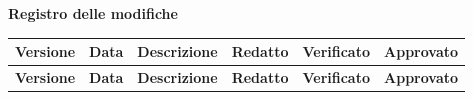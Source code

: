 \documentclass[a4paper,11pt]{article}
\begin{document}
\newpage

{\Large\bfseries\color{primaryblue} Registro delle modifiche}\\[0.5cm]

\setlength{\extrarowheight}{2pt}
\renewcommand{\arraystretch}{1.5}

{\footnotesize
\begin{xltabular}{\textwidth}{|>{\raggedright\arraybackslash}p{1.5cm}|>{\raggedright\arraybackslash}p{2cm}|X|>{\raggedright\arraybackslash}p{1.8cm}|>{\raggedright\arraybackslash}p{2cm}|>{\raggedright\arraybackslash}p{2cm}|}
\hline
{}
\textbf{\color{white} Versione} & \textbf{\color{white} Data} & \textbf{\color{white} Descrizione} & \textbf{\color{white} Redatto} & \textbf{\color{white} Verificato} & \textbf{\color{white} Approvato} \\
\hline
\endfirsthead %

\hline
{}
\textbf{\color{white} Versione} & \textbf{\color{white} Data} & \textbf{\color{white} Descrizione} & \textbf{\color{white} Redatto} & \textbf{\color{white} Verificato} & \textbf{\color{white} Approvato} \\
\hline
\endhead %


\end{xltabular}}
\end{document}
